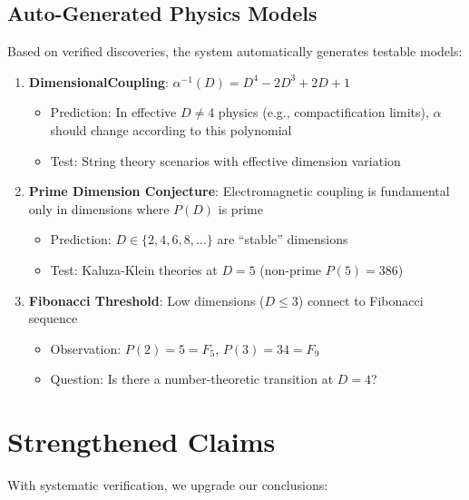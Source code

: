 \documentclass[11pt,a4paper]{article}
\begin{document}
\subsection{Auto-Generated Physics Models}

Based on verified discoveries, the system automatically generates testable models:

\begin{enumerate}
    \item \textbf{DimensionalCoupling}: $\alpha^{-1}(D) = D^4 - 2D^3 + 2D + 1$
    \begin{itemize}
        \item Prediction: In effective $D \neq 4$ physics (e.g., compactification limits), $\alpha$ should change according to this polynomial
        \item Test: String theory scenarios with effective dimension variation
    \end{itemize}
    
    \item \textbf{Prime Dimension Conjecture}: Electromagnetic coupling is fundamental only in dimensions where $P(D)$ is prime
    \begin{itemize}
        \item Prediction: $D \in \{2, 4, 6, 8, \ldots\}$ are ``stable'' dimensions
        \item Test: Kaluza-Klein theories at $D=5$ (non-prime $P(5)=386$)
    \end{itemize}
    
    \item \textbf{Fibonacci Threshold}: Low dimensions ($D \leq 3$) connect to Fibonacci sequence
    \begin{itemize}
        \item Observation: $P(2) = 5 = F_5$, $P(3) = 34 = F_9$
        \item Question: Is there a number-theoretic transition at $D=4$?
    \end{itemize}
\end{enumerate}

\section{Strengthened Claims}

With systematic verification, we upgrade our conclusions:
\end{document}
